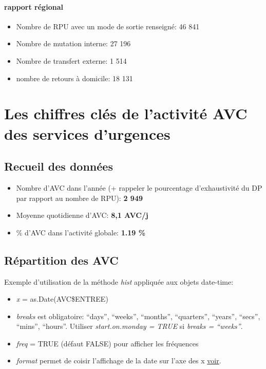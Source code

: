 \documentclass[]{article}
\begin{document}
\paragraph{rapport régional}\label{rapport-regional}

\begin{itemize}
\itemsep1pt\parskip0pt
\item
  Nombre de RPU avec un mode de sortie renseigné: 46 841
\item
  Nombre de mutation interne: 27 196
\item
  Nombre de transfert externe: 1 514
\item
  nombre de retours à domicile: 18 131
\end{itemize}

\section{Les chiffres clés de l'activité AVC des services
d'urgences}\label{les-chiffres-cles-de-lactivite-avc-des-services-durgences}

\subsection{Recueil des données}\label{recueil-des-donnees-3}

\begin{itemize}
\itemsep1pt\parskip0pt
\item
  Nombre d'AVC dans l'année (+ rappeler le pourcentage d'exhaustivité du
  DP par rapport au nombre de RPU): \textbf{2 949}
\item
  Moyenne quotidienne d'AVC: \textbf{8,1 AVC/j}
\item
  \% d'AVC dans l'activité globale: \textbf{1.19 \%}
\end{itemize}

\subsection{Répartition des AVC}\label{repartition-des-avc}

Exemple d'utilisation de la méthode \emph{hist} appliquée aux objets
date-time:

\begin{itemize}
\itemsep1pt\parskip0pt
\item
  \emph{x} = as.Date(AVC\$ENTREE)
\item
  \emph{breaks} est obligatoire: ``days'', ``weeks'', ``months'',
  ``quarters'', ``years'', ``secs'', ``mins'', ``hours''. Utiliser
  \emph{start.on.monday = TRUE} si \emph{breaks = ``weeks''}.
\item
  \emph{freq} = TRUE (défaut FALSE) pour afficher les fréquences
\item
  \emph{format} permet de coisir l'affichage de la date sur l'axe des x
  \href{https://stat.ethz.ch/R-manual/R-devel/library/base/html/strptime.html}{voir}.
\end{itemize}
\end{document}
